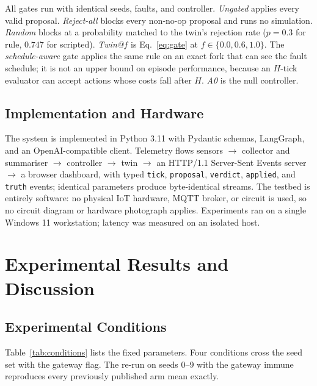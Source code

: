 \documentclass[conference]{IEEEtran}
\begin{document}
All gates run with identical seeds, faults, and controller. \emph{Ungated} applies every valid proposal. \emph{Reject-all} blocks every non-no-op proposal and runs no simulation. \emph{Random} blocks at a probability matched to the twin's rejection rate ($p = 0.3$ for rule, $0.747$ for scripted). \emph{Twin@$f$} is Eq.~\eqref{eq:gate} at $f \in \{0.0, 0.6, 1.0\}$. The \emph{schedule-aware} gate applies the same rule on an exact fork that can see the fault schedule; it is not an upper bound on episode performance, because an $H$-tick evaluator can accept actions whose costs fall after $H$. \emph{A0} is the null controller.

\subsection{Implementation and Hardware}

The system is implemented in Python 3.11 with Pydantic schemas, LangGraph, and an OpenAI-compatible client. Telemetry flows sensors $\to$ collector and summariser $\to$ controller $\to$ twin $\to$ an HTTP/1.1 Server-Sent Events server $\to$ a browser dashboard, with typed \texttt{tick}, \texttt{proposal}, \texttt{verdict}, \texttt{applied}, and \texttt{truth} events; identical parameters produce byte-identical streams. The testbed is entirely software: no physical IoT hardware, MQTT broker, or circuit is used, so no circuit diagram or hardware photograph applies. Experiments ran on a single Windows 11 workstation; latency was measured on an isolated host.

\section{Experimental Results and Discussion}

\subsection{Experimental Conditions}

Table~\ref{tab:conditions} lists the fixed parameters. Four conditions cross the seed set with the gateway flag. The re-run on seeds 0--9 with the gateway immune reproduces every previously published arm mean exactly.
\end{document}
